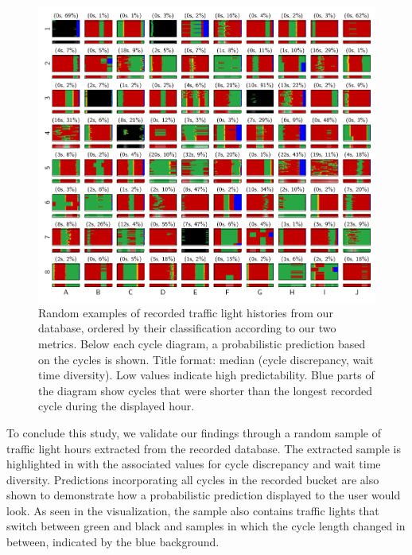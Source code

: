 \begin{figure}[!t]
    \centering
    \includegraphics[width=\linewidth]{images/predictability-case-studies.pdf}
    \caption{Random examples of recorded traffic light histories from our database, ordered by their classification according to our two metrics. Below each cycle diagram, a probabilistic prediction based on the cycles is shown. Title format: median (cycle discrepancy, wait time diversity). Low values indicate high predictability. Blue parts of the diagram show cycles that were shorter than the longest recorded cycle during the displayed hour.}\label{fig:types-of-instability}
\end{figure}

To conclude this study, we validate our findings through a random sample of traffic light hours extracted from the recorded database. The extracted sample is highlighted in  with the associated values for cycle discrepancy and wait time diversity. Predictions incorporating all cycles in the recorded bucket are also shown to demonstrate how a probabilistic prediction displayed to the user would look. As seen in the visualization, the sample also contains traffic lights that switch between green and black and samples in which the cycle length changed in between, indicated by the blue background.

